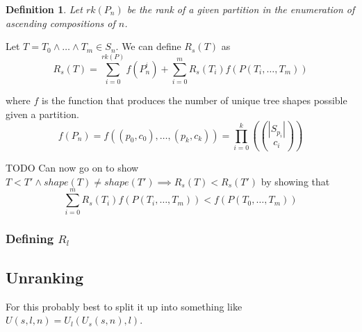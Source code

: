 \documentclass{article}
\newcommand{\wlw}{\wedge{} \ldots{} \wedge{}}
\newcommand{\shape}[1]{shape(#1)}
\newcommand{\multichoose}[2]{\left(\!\!{#1 \choose{} #2}\!\!\right)}
\newtheorem{definition}{Definition}
\begin{document}
\begin{definition}
    Let $rk(P_n)$ be the rank of a given partition in the enumeration of ascending
    compositions of $n$.
\end{definition}


Let $T = T_0 \wlw T_m \in S_n$. We can define $R_s(T)$ as
\[
    R_s(T) = \sum_{i=0}^{rk(P)} f(P_n^i) + \sum_{i=0}^m R_s(T_i)f(P(T_i, \ldots, T_m))
\]

where $f$ is the function that produces the number of unique tree shapes possible
given a partition.
\[
    f(P_n)
    = f((p_0, c_0), \ldots, (p_k, c_k))
    = \prod_{i=0}^k \multichoose{|S_{p_i}|}{c_i}
\]

TODO
Can now go on to show $T < T' \land \shape{T} \neq \shape{T'} \implies R_s(T) < R_s(T')$
by showing that
\[
    \sum_{i=0}^m R_s(T_i)f(P(T_i, \ldots, T_m)) < f(P(T_0, \ldots, T_m))
\]

\subsubsection{Defining $R_l$}

\subsection{Unranking}
For this probably best to split it up into something like
$U(s, l, n) = U_l(U_s(s, n), l)$.
\end{document}
